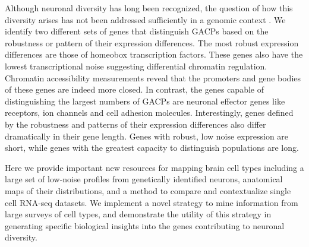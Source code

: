 Although neuronal diversity has long been recognized, the question of how this diversity arises has not been addressed sufficiently in a genomic context \citep{Arendt_2016, Muotri_2006}. We identify two different sets of genes that distinguish GACPs based on the robustness or pattern of their expression differences. The most robust expression differences are those of homeobox transcription factors. These genes also have the lowest transcriptional noise suggesting differential chromatin regulation. Chromatin accessibility measurements reveal that the promoters and gene bodies of these genes are indeed more closed. In contrast, the genes capable of distinguishing the largest numbers of GACPs are neuronal effector genes like receptors, ion channels and cell adhesion molecules. Interestingly, genes defined by the robustness and patterns of their expression differences also differ dramatically in their gene length. Genes with robust, low noise expression are short, while genes with the greatest capacity to distinguish populations are long.

Here we provide important new resources for mapping brain cell types including a large set of low-noise profiles from genetically identified neurons, anatomical maps of their distributions, and a method to compare and contextualize single cell RNA-seq datasets. We implement a novel strategy to mine information from large surveys of cell types, and demonstrate the utility of this strategy in generating specific biological insights into the genes contributing to neuronal diversity.


